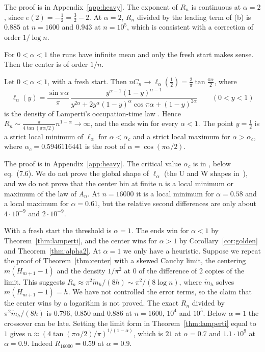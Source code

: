 The proof is in Appendix~\ref{app:heavy}. The exponent of $R_n$ is
continuous at $\alpha=2$, since $e(2)=-\frac12=\frac32-2$. At $\alpha=2$,
$R_n$ divided by the leading term of (b) is $0.885$ at $n=1600$ and $0.943$ at
$n=10^5$, which is consistent with a correction of order $1/\log n$.

For $0<\alpha<1$ the runs have infinite mean and only the fresh start makes
sense. Then the center is of order $1/n$.

\begin{theorem}[$0<\alpha<1$]\label{thm:lamperti}
Let $0<\alpha<1$, with a fresh start. Then
$nC_n\to\ell_\alpha(\frac12)=\frac2\pi\tan\frac{\pi\alpha}2$, where
\[
 \ell_\alpha(y)=\frac{\sin\pi\alpha}{\pi}\,
 \frac{y^{\alpha-1}(1-y)^{\alpha-1}}{y^{2\alpha}+2y^\alpha(1-y)^\alpha
 \cos\pi\alpha+(1-y)^{2\alpha}}\qquad(0<y<1)
\]
is the density of Lamperti's occupation-time law
\cite{lamperti1958,godrecheluck2001}. Hence
$R_n\sim\frac{\pi}{4\tan(\pi\alpha/2)}n^{1-\alpha}\to\infty$, and the ends
win for every $\alpha<1$. The point $y=\frac12$ is a strict local minimum of
$\ell_\alpha$ for $\alpha<\alpha_c$ and a strict local maximum for
$\alpha>\alpha_c$, where $\alpha_c=0.5946116441$ is the root of
$\alpha=\cos(\pi\alpha/2)$.
\end{theorem}

The proof is in Appendix~\ref{app:heavy}. The critical value $\alpha_c$ is in
\cite[Section~7]{godrecheluck2001}, below eq.~(7.6). We do not prove the
global shape of $\ell_\alpha$ (the U and W shapes
in~\cite{godrecheluck2001,zdk2015}),
and we do not prove that the center bin at finite $n$ is a local minimum or
maximum of the law of $A_n$. At $n=16000$ it is a local minimum for
$\alpha=0.58$ and a local maximum for $\alpha=0.61$, but the relative second
differences are only about $4\cdot10^{-9}$ and $2\cdot10^{-9}$.

\begin{remark}\label{rem:fresh}
With a fresh start the threshold is $\alpha=1$. The ends win for $\alpha<1$
by Theorem~\ref{thm:lamperti}, and the center wins for $\alpha>1$ by
Corollary~\ref{cor:golden} and Theorem~\ref{thm:alpha2}. At $\alpha=1$ we
only have a heuristic. Suppose we repeat the proof of
Theorem~\ref{thm:center} with a skewed Cauchy limit, the centering
$m(H_{m+1}-1)$ and the density $1/\pi^2$ at $0$ of the difference of 2
copies of the limit. This suggests
$R_n\approx\pi^2\tilde m_h/(8h)\sim\pi^2/(8\log n)$, where $\tilde m_h$
solves $m(H_{m+1}-1)=h$. We have not controlled the error terms, so the claim that
the center wins by a logarithm is not proved. The exact $R_n$ divided by
$\pi^2\tilde m_h/(8h)$ is $0.796$, $0.850$ and $0.886$ at $n=1600$, $10^4$ and
$10^5$. Below $\alpha=1$ the crossover can be late. Setting the limit form in
Theorem~\ref{thm:lamperti} equal to $1$ gives
$n\approx(4\tan(\pi\alpha/2)/\pi)^{1/(1-\alpha)}$, which is $21$ at
$\alpha=0.7$ and $1.1\cdot10^9$ at $\alpha=0.9$. Indeed $R_{16000}=0.59$ at
$\alpha=0.9$.
\end{remark}

